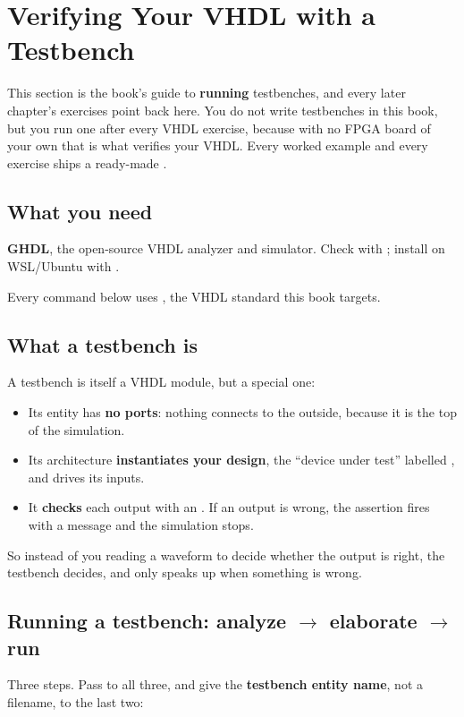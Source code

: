 
\section{Verifying Your VHDL with a Testbench}
\label{c2:app:c}
This section is the book's guide to \textbf{running} testbenches, and every later chapter's
exercises point back here. You do not write testbenches in this book, but you run one after every
VHDL exercise, because with no FPGA board of your own that is what verifies your VHDL. Every worked example and every exercise ships a
ready-made .

\subsection{What you need}
\label{c2:c1}
\textbf{GHDL}, the open-source VHDL analyzer and simulator. Check with ; install
on WSL/Ubuntu with .

Every command below uses , the VHDL standard this book targets.

\subsection{What a testbench is}
\label{c2:c2}
A testbench is itself a VHDL module, but a special one:
\begin{itemize}
  \item Its entity has \textbf{no ports}: nothing connects to the outside, because it is the top of
    the simulation.
  \item Its architecture \textbf{instantiates your design}, the ``device under test'' labelled
    , and drives its inputs.
  \item It \textbf{checks} each output with an . If an output is wrong, the assertion
    fires with a message and the simulation stops.
\end{itemize}
So instead of you reading a waveform to decide whether the output is right, the testbench decides,
and only speaks up when something is wrong.

\subsection{Running a testbench: analyze \texorpdfstring{$\to$}{->} elaborate
  \texorpdfstring{$\to$}{->} run}
\label{c2:c3}
Three steps. Pass  to all three, and give the \textbf{testbench entity name}, not a
filename, to the last two:

